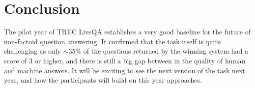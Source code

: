\documentclass[]{article}
\begin{document}
\section{Conclusion}

The pilot year of TREC LiveQA establishes a very good baseline for the future of non-factoid question answering.
It confirmed that the task itself is quite challenging as only $\sim$35\% of the questions returned by the winning system had a score of 3 or higher, and there is still a big gap between in the quality of human and machine answers.
It will be exciting to see the next version of the task next year, and how the participants will build on this year approaches.




\end{document}
